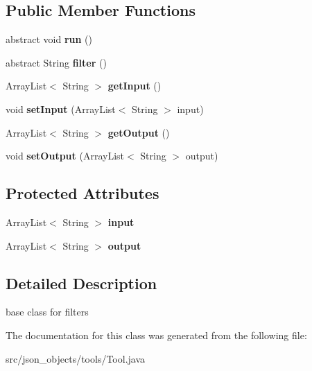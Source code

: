 \subsection*{Public Member Functions}
\begin{DoxyCompactItemize}
\item 
\hypertarget{classjson__objects_1_1tools_1_1_tool_a80fc57096b50878d51ee6756bca2f61b}{
abstract void {\bfseries run} ()}
\label{classjson__objects_1_1tools_1_1_tool_a80fc57096b50878d51ee6756bca2f61b}

\item 
\hypertarget{classjson__objects_1_1tools_1_1_tool_af509e9e418088b2bf33e1b9696b009a2}{
abstract String {\bfseries filter} ()}
\label{classjson__objects_1_1tools_1_1_tool_af509e9e418088b2bf33e1b9696b009a2}

\item 
\hypertarget{classjson__objects_1_1tools_1_1_tool_acfa04da5a94d870feba5a189cec44370}{
ArrayList$<$ String $>$ {\bfseries getInput} ()}
\label{classjson__objects_1_1tools_1_1_tool_acfa04da5a94d870feba5a189cec44370}

\item 
\hypertarget{classjson__objects_1_1tools_1_1_tool_a876c434149908b8a7860078f8d737e2d}{
void {\bfseries setInput} (ArrayList$<$ String $>$ input)}
\label{classjson__objects_1_1tools_1_1_tool_a876c434149908b8a7860078f8d737e2d}

\item 
\hypertarget{classjson__objects_1_1tools_1_1_tool_a52184588ebdb2b3b08499c67d7fba266}{
ArrayList$<$ String $>$ {\bfseries getOutput} ()}
\label{classjson__objects_1_1tools_1_1_tool_a52184588ebdb2b3b08499c67d7fba266}

\item 
\hypertarget{classjson__objects_1_1tools_1_1_tool_a795e107096bb1200702145595d8858c7}{
void {\bfseries setOutput} (ArrayList$<$ String $>$ output)}
\label{classjson__objects_1_1tools_1_1_tool_a795e107096bb1200702145595d8858c7}

\end{DoxyCompactItemize}
\subsection*{Protected Attributes}
\begin{DoxyCompactItemize}
\item 
\hypertarget{classjson__objects_1_1tools_1_1_tool_a8238cbae28739d3eaeca8206c6ba0f27}{
ArrayList$<$ String $>$ {\bfseries input}}
\label{classjson__objects_1_1tools_1_1_tool_a8238cbae28739d3eaeca8206c6ba0f27}

\item 
\hypertarget{classjson__objects_1_1tools_1_1_tool_aa2dabf8d668a94b74925fc9e4fa2a0fe}{
ArrayList$<$ String $>$ {\bfseries output}}
\label{classjson__objects_1_1tools_1_1_tool_aa2dabf8d668a94b74925fc9e4fa2a0fe}

\end{DoxyCompactItemize}


\subsection{Detailed Description}
base class for filters 

The documentation for this class was generated from the following file:\begin{DoxyCompactItemize}
\item 
src/json\_\-objects/tools/Tool.java\end{DoxyCompactItemize}
